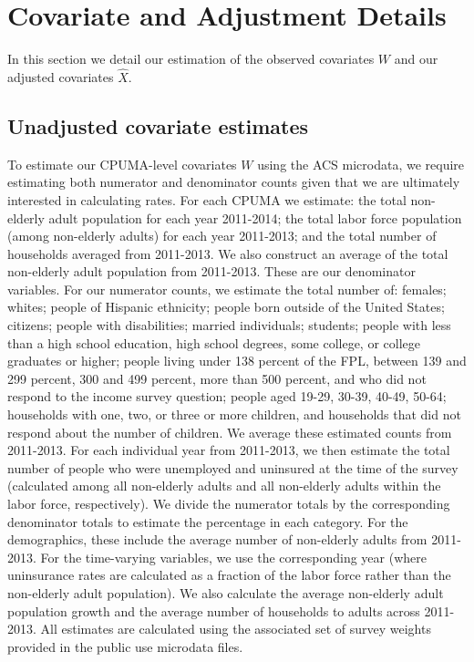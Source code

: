 \section{Covariate and Adjustment Details}\label{app:adjustmentdetails}

In this section we detail our estimation of the observed covariates $W$ and our adjusted covariates $\hat{X}$. 

\subsection{Unadjusted covariate estimates}

To estimate our CPUMA-level covariates $W$ using the ACS microdata, we require estimating both numerator and denominator counts given that we are ultimately interested in calculating rates. For each CPUMA we estimate: the total non-elderly adult population for each year 2011-2014; the total labor force population (among non-elderly adults) for each year 2011-2013; and the total number of households averaged from 2011-2013. We also construct an average of the total non-elderly adult population from 2011-2013. These are our denominator variables. For our numerator counts, we estimate the total number of: females; whites; people of Hispanic ethnicity; people born outside of the United States; citizens; people with disabilities; married individuals; students; people with less than a high school education, high school degrees, some college, or college graduates or higher; people living under 138 percent of the FPL, between 139 and 299 percent, 300 and 499 percent, more than 500 percent, and who did not respond to the income survey question; people aged 19-29, 30-39, 40-49, 50-64; households with one, two, or three or more children, and households that did not respond about the number of children. We average these estimated counts from 2011-2013. For each individual year from 2011-2013, we then estimate the total number of people who were unemployed and uninsured at the time of the survey (calculated among all non-elderly adults and all non-elderly adults within the labor force, respectively). We divide the numerator totals by the corresponding denominator totals to estimate the percentage in each category. For the demographics, these include the average number of non-elderly adults from 2011-2013. For the time-varying variables, we use the corresponding year (where uninsurance rates are calculated as a fraction of the labor force rather than the non-elderly adult population). We also calculate the average non-elderly adult population growth and the average number of households to adults across 2011-2013. All estimates are calculated using the associated set of survey weights provided in the public use microdata files.

